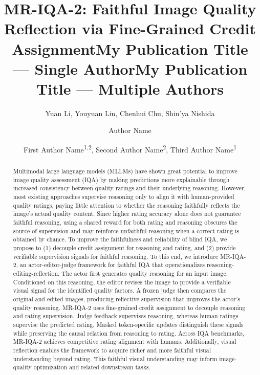 \documentclass[letterpaper]{article} %
\title{MR-IQA-2: Faithful Image Quality Reflection via Fine-Grained Credit Assignment}
\author{
    Yuan Li, Youyuan Lin, Chenhui Chu, Shin'ya Nishida
}
\title{My Publication Title --- Single Author}
\author {
    Author Name
}
\title{My Publication Title --- Multiple Authors}
\author {
    First Author Name\textsuperscript{\rm 1,\rm 2}\equalcontrib,
    Second Author Name\textsuperscript{\rm 2}\equalcontrib,
    Third Author Name\textsuperscript{\rm 1}\corresponding
}
\begin{document}
\maketitle

\begin{abstract}


Multimodal large language models (MLLMs) have shown great potential to improve image quality assessment (IQA) by making predictions more explainable through increased consistency between quality ratings and their underlying reasoning. However, most existing approaches supervise reasoning only to align it with human-provided quality ratings, paying little attention to whether the reasoning faithfully reflects the image’s actual quality content. Since higher rating accuracy alone does not guarantee faithful reasoning, using a shared reward for both rating and reasoning obscures the source of supervision and may reinforce unfaithful reasoning when a correct rating is obtained by chance.
To improve the faithfulness and reliability of blind IQA, we propose to (1) decouple credit assignment for reasoning and rating, and (2) provide verifiable supervision signals for faithful reasoning.
To this end, we introduce MR-IQA-2, an actor-editor-judge framework for faithful IQA that operationalizes reasoning-editing-reflection. The actor first generates quality reasoning for an input image. Conditioned on this reasoning, the editor revises the image to provide a verifiable visual signal for the identified quality factors. A frozen judge then compares the original and edited images, producing reflective supervision that improves the actor’s quality reasoning.
MR-IQA-2 uses fine-grained credit assignment to decouple reasoning and rating supervision. Judge feedback supervises reasoning, whereas human ratings supervise the predicted rating. Masked token-specific updates distinguish these signals while preserving the causal relation from reasoning to rating.
Across IQA benchmarks, MR-IQA-2 achieves competitive rating alignment with humans. Additionally, visual reflection enables the framework to acquire richer and more faithful visual understanding beyond rating. This faithful visual understanding may inform image-quality optimization and related downstream tasks.
\end{abstract}

\end{document}

